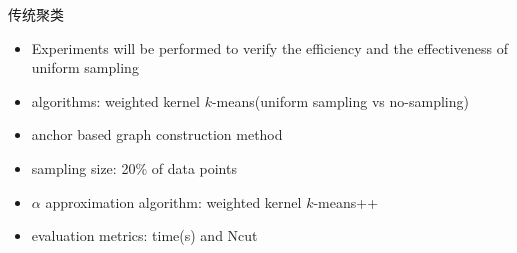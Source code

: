 \documentclass[notheorems]{beamer}
\begin{document}
\begin{CJK*}{UTF8}{gbsn}
\begin{frame}{传统聚类}
	\begin{center}
	\end{center}
	\begin{itemize}
		\scriptsize
		\item Experiments will be performed to verify the efficiency and the effectiveness of uniform sampling
		\item algorithms: weighted kernel $k$-means(uniform sampling vs no-sampling)
		\item anchor based graph construction method
		\item sampling size: 20\% of data points
		\item $\alpha$ approximation algorithm: weighted kernel $k$-means++
		\item evaluation metrics: time(s) and Ncut
	\end{itemize}
\end{frame}


\end{CJK*}
\end{document}
